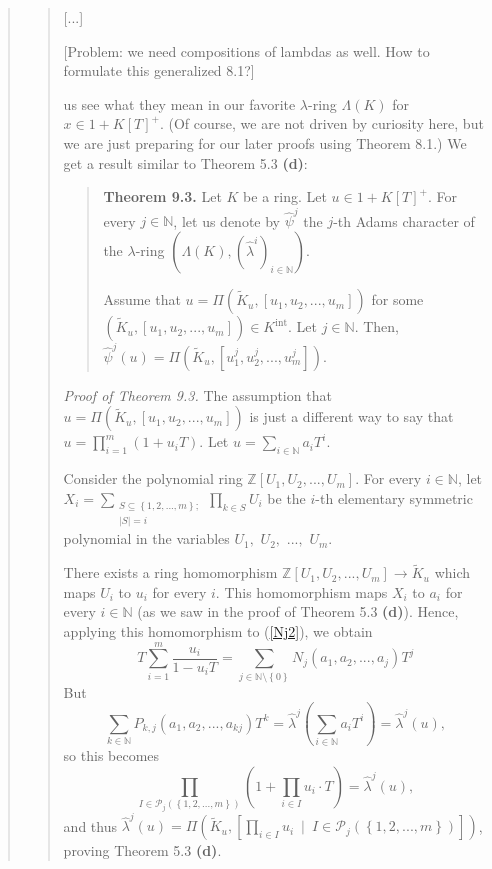 \documentclass[12pt,final,notitlepage,onecolumn,german]{article}%
\begin{document}
\begin{quote}
\begin{quote}
[...]

[Problem: we need compositions of lambdas as well. How to formulate this
generalized 8.1?]

us see what they mean in our favorite $\lambda$-ring $\Lambda\left(  K\right)
$ for $x\in1+K\left[  T\right]  ^{+}$. (Of course, we are not driven by
curiosity here, but we are just preparing for our later proofs using Theorem
8.1.) We get a result similar to Theorem 5.3 \textbf{(d)}:

\begin{quote}
\textbf{Theorem 9.3.} Let $K$ be a ring. Let $u\in1+K\left[  T\right]  ^{+}$.
For every $j\in\mathbb{N}$, let us denote by $\widehat{\psi}^{j}$ the $j$-th
Adams character of the $\lambda$-ring $\left(  \Lambda\left(  K\right)
,\left(  \widehat{\lambda}^{i}\right)  _{i\in\mathbb{N}}\right)  $.

Assume that $u=\Pi\left(  \widetilde{K}_{u},\left[  u_{1},u_{2},...,u_{m}%
\right]  \right)  $ for some $\left(  \widetilde{K}_{u},\left[  u_{1}%
,u_{2},...,u_{m}\right]  \right)  \in K^{\operatorname*{int}}$. Let
$j\in\mathbb{N}$. Then, $\widehat{\psi}^{j}\left(  u\right)  =\Pi\left(
\widetilde{K}_{u},\left[  u_{1}^{j},u_{2}^{j},...,u_{m}^{j}\right]  \right)  $.
\end{quote}

\textit{Proof of Theorem 9.3.} The assumption that $u=\Pi\left(  \widetilde
{K}_{u},\left[  u_{1},u_{2},...,u_{m}\right]  \right)  $ is just a different
way to say that $u=\prod\limits_{i=1}^{m}\left(  1+u_{i}T\right)  $. Let
$u=\sum\limits_{i\in\mathbb{N}}a_{i}T^{i}$.

Consider the polynomial ring $\mathbb{Z}\left[  U_{1},U_{2},...,U_{m}\right]
$. For every $i\in\mathbb{N}$, let $X_{i}=\sum\limits_{\substack{S\subseteq
\left\{  1,2,...,m\right\}  ;\\\left\vert S\right\vert =i}}\prod\limits_{k\in
S}U_{i}$ be the $i$-th elementary symmetric polynomial in the variables
$U_{1},$ $U_{2},$ $...,$ $U_{m}$.

There exists a ring homomorphism $\mathbb{Z}\left[  U_{1},U_{2},...,U_{m}%
\right]  \rightarrow\widetilde{K}_{u}$ which maps $U_{i}$ to $u_{i}$ for every
$i$. This homomorphism maps $X_{i}$ to $a_{i}$ for every $i\in\mathbb{N}$ (as
we saw in the proof of Theorem 5.3 \textbf{(d)}). Hence, applying this
homomorphism to (\ref{Nj2}), we obtain%
\[
T\sum_{i=1}^{m}\dfrac{u_{i}}{1-u_{i}T}=\sum_{j\in\mathbb{N}\setminus\left\{
0\right\}  }N_{j}\left(  a_{1},a_{2},...,a_{j}\right)  T^{j}%
\]
But%
\[
\sum_{k\in\mathbb{N}}P_{k,j}\left(  a_{1},a_{2},...,a_{kj}\right)
T^{k}=\widehat{\lambda}^{j}\left(  \sum_{i\in\mathbb{N}}a_{i}T^{i}\right)
=\widehat{\lambda}^{j}\left(  u\right)  ,
\]
so this becomes%
\[
\prod_{I\in\mathcal{P}_{j}\left(  \left\{  1,2,...,m\right\}  \right)
}\left(  1+\prod_{i\in I}u_{i}\cdot T\right)  =\widehat{\lambda}^{j}\left(
u\right)  ,
\]
and thus $\widehat{\lambda}^{j}\left(  u\right)  =\Pi\left(  \widetilde{K}%
_{u},\left[  \prod\limits_{i\in I}u_{i}\ \mid\ I\in\mathcal{P}_{j}\left(
\left\{  1,2,...,m\right\}  \right)  \right]  \right)  $, proving Theorem 5.3
\textbf{(d)}.


\end{quote}
\end{quote}
\end{document}
